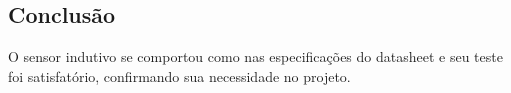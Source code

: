 

\subsection{Conclusão}

O sensor indutivo se comportou como nas especificações do datasheet e seu teste
foi satisfatório, confirmando sua necessidade no projeto.

